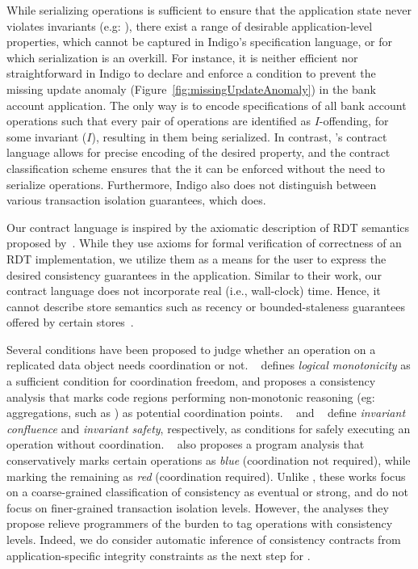 While serializing operations is sufficient to ensure that the application state
never violates invariants (e.g: ), there exist a range of
desirable application-level properties, which cannot be captured in Indigo's
specification language, or for which serialization is an overkill. For instance,
it is neither efficient nor straightforward in Indigo to declare and enforce a
condition to prevent the missing update anomaly
(Figure~\ref{fig:missingUpdateAnomaly}) in the bank account application. The
only way is to encode specifications of all bank account operations such that
every pair of operations are identified as $I$-offending, for some invariant
($I$), resulting in them being serialized. In contrast, \name's contract
language allows for precise encoding of the desired property, and the contract
classification scheme ensures that the it can be enforced without the need to
serialize operations. Furthermore, Indigo also does not distinguish between
various transaction isolation guarantees, which \name does.

Our contract language is inspired by the axiomatic description of RDT semantics
proposed by~\cite{Burckhardt2014}. While they use axioms for formal
verification of correctness of an RDT implementation, we utilize them as a
means for the user to express the desired consistency guarantees in the
application. Similar to their work, our contract language does not incorporate
real (i.e., wall-clock) time. Hence, it cannot describe store semantics such as
recency or bounded-staleness guarantees offered by certain
stores~\cite{Pileus}.

Several conditions have been proposed to judge whether an operation on a
replicated data object needs coordination or not. ~\cite{Calm} defines
\emph{logical monotonicity} as a sufficient condition for coordination freedom,
and proposes a consistency analysis that marks code regions performing
non-monotonic reasoning (eg: aggregations, such as ) as potential
coordination points. ~\cite{IConfluence} and ~\cite{Sieve} define
\emph{invariant confluence} and \emph{invariant safety}, respectively, as
conditions for safely executing an operation without coordination.
~\cite{Sieve} also proposes a program analysis that conservatively marks
certain operations as \emph{blue} (coordination not required), while marking
the remaining as \emph{red} (coordination required). Unlike \name, these works
focus on a coarse-grained classification of consistency as eventual or strong,
and do not focus on finer-grained transaction isolation levels. However, the
analyses they propose relieve programmers of the burden to tag operations with
consistency levels. Indeed, we do consider automatic inference of consistency
contracts from application-specific integrity constraints as the next step for
\name.
